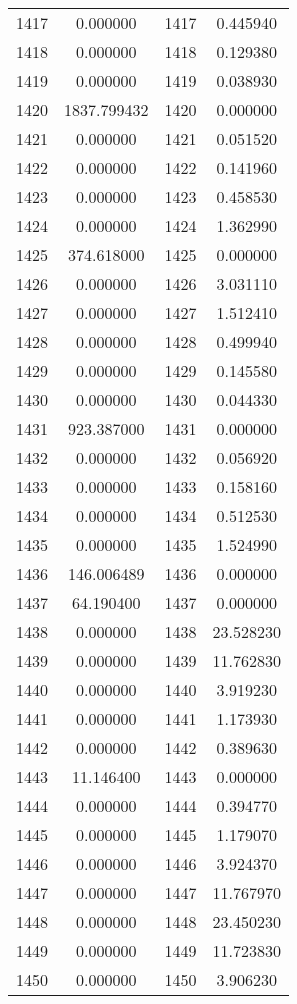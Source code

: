 \documentclass[12pt]{article}
\begin{document}
\begin{longtable}{@{}cccc@{}}
1417 & 0.000000 & 1417 & 0.445940 \\
1418 & 0.000000 & 1418 & 0.129380 \\
1419 & 0.000000 & 1419 & 0.038930 \\
1420 & 1837.799432 & 1420 & 0.000000 \\
1421 & 0.000000 & 1421 & 0.051520 \\
1422 & 0.000000 & 1422 & 0.141960 \\
1423 & 0.000000 & 1423 & 0.458530 \\
1424 & 0.000000 & 1424 & 1.362990 \\
1425 & 374.618000 & 1425 & 0.000000 \\
1426 & 0.000000 & 1426 & 3.031110 \\
1427 & 0.000000 & 1427 & 1.512410 \\
1428 & 0.000000 & 1428 & 0.499940 \\
1429 & 0.000000 & 1429 & 0.145580 \\
1430 & 0.000000 & 1430 & 0.044330 \\
1431 & 923.387000 & 1431 & 0.000000 \\
1432 & 0.000000 & 1432 & 0.056920 \\
1433 & 0.000000 & 1433 & 0.158160 \\
1434 & 0.000000 & 1434 & 0.512530 \\
1435 & 0.000000 & 1435 & 1.524990 \\
1436 & 146.006489 & 1436 & 0.000000 \\
1437 & 64.190400 & 1437 & 0.000000 \\
1438 & 0.000000 & 1438 & 23.528230 \\
1439 & 0.000000 & 1439 & 11.762830 \\
1440 & 0.000000 & 1440 & 3.919230 \\
1441 & 0.000000 & 1441 & 1.173930 \\
1442 & 0.000000 & 1442 & 0.389630 \\
1443 & 11.146400 & 1443 & 0.000000 \\
1444 & 0.000000 & 1444 & 0.394770 \\
1445 & 0.000000 & 1445 & 1.179070 \\
1446 & 0.000000 & 1446 & 3.924370 \\
1447 & 0.000000 & 1447 & 11.767970 \\
1448 & 0.000000 & 1448 & 23.450230 \\
1449 & 0.000000 & 1449 & 11.723830 \\
1450 & 0.000000 & 1450 & 3.906230 \\

\end{longtable}
\end{document}
